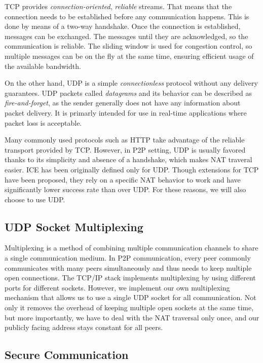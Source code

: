 TCP provides \textit{connection-oriented}, \textit{reliable} streams. That means that the connection needs to be established before any communication happens. This is done by means of a two-way handshake. Once the connection is established, messages can be exchanged. The messages until they are acknowledged, so the communication is reliable. The sliding window is used for congestion control, so multiple messages can be on the fly at the same time, ensuring efficient usage of the available bandwidth.

On the other hand, UDP is a simple \textit{connectionless} protocol without any delivery guarantees. UDP packets called \textit{datagrams} and its behavior can be described as \textit{fire-and-forget}, as the sender generally does not have any information about packet delivery. It is primarly intended for use in real-time applications where packet loss is acceptable. %

Many commonly used protocols such as HTTP take advantage of the reliable transport provided by TCP. However, in P2P setting, UDP is usually favored thanks to its simplicity and absence of a handshake, which makes NAT traveral easier. ICE has been originally defined only for UDP. Though extensions for TCP have been proposed, they rely on a specific NAT behavior to work and have significantly lower success rate than over UDP. For these reasons, we will also choose to use UDP.

\subsection{UDP Socket Multiplexing}

Multiplexing is a method of combining multiple communication channels to share a single communication medium. In P2P communication, every peer commonly communicates with many peers simultaneously and thus needs to keep multiple open connections. The TCP/IP stack implements multiplexing by using different ports for different sockets. However, we implement our own multiplexing mechanism that allows us to use a single UDP socket for all communication. Not only it removes the overhead of keeping multiple open sockets at the same time, but more importantly, we have to deal with the NAT traversal only once, and our publicly facing address stays constant for all peers.

\subsection{Secure Communication}

